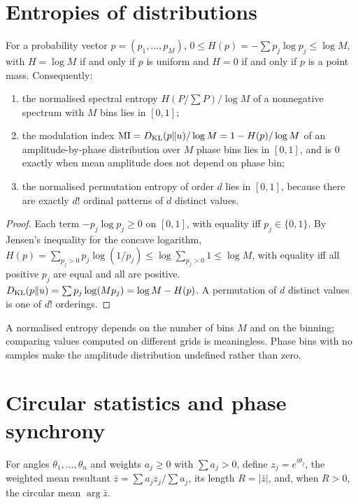 \section{Entropies of distributions}
\begin{theorem}\label{ars:info-001}
For a probability vector $p=(p_1,\dots,p_M)$, $0\le H(p)=-\sum p_j\log p_j\le\log M$, with $H=\log M$ if and only if $p$ is uniform and $H=0$ if and only if $p$ is a point mass. Consequently:
\begin{enumerate}[leftmargin=2em]
\item the normalised spectral entropy $H(P/\sum P)/\log M$ of a nonnegative spectrum with $M$ bins lies in $[0,1]$;
\item the modulation index $\mathrm{MI}=D_{\mathrm{KL}}(p\Vert u)/\log M=1-H(p)/\log M$ of an amplitude-by-phase distribution over $M$ phase bins lies in $[0,1]$, and is $0$ exactly when mean amplitude does not depend on phase bin;
\item the normalised permutation entropy of order $d$ lies in $[0,1]$, because there are exactly $d!$ ordinal patterns of $d$ distinct values.
\end{enumerate}
\end{theorem}
\begin{proof}
Each term $-p_j\log p_j\ge0$ on $[0,1]$, with equality iff $p_j\in\{0,1\}$. By Jensen's inequality for the concave logarithm, $H(p)=\sum_{p_j>0}p_j\log(1/p_j)\le\log\sum_{p_j>0}1\le\log M$, with equality iff all positive $p_j$ are equal and all are positive. $D_{\mathrm{KL}}(p\Vert u)=\sum p_j\log(Mp_j)=\log M-H(p)$. A permutation of $d$ distinct values is one of $d!$ orderings.
\end{proof}
\begin{remark}
A normalised entropy depends on the number of bins $M$ and on the binning; comparing values computed on different grids is meaningless. Phase bins with no samples make the amplitude distribution undefined rather than zero.
\end{remark}

\section{Circular statistics and phase synchrony}
For angles $\theta_1,\dots,\theta_n$ and weights $a_j\ge0$ with $\sum a_j>0$, define $z_j=e^{i\theta_j}$, the weighted mean resultant $\bar z=\sum a_jz_j/\sum a_j$, its length $R=|\bar z|$, and, when $R>0$, the circular mean $\arg\bar z$.


